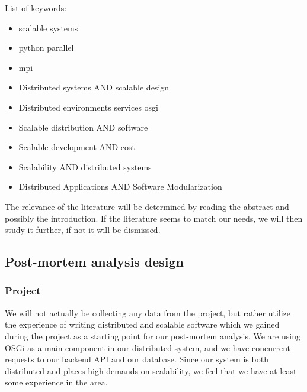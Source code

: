 \documentclass{article}
\begin{document}
List of keywords:
\begin{itemize}
\item{scalable systems}
\item{python parallel}
\item{mpi}
\item{Distributed systems AND scalable design}
\item{Distributed environments services osgi}
\item{Scalable distribution AND software}
\item{Scalable development AND cost}
\item{Scalability AND distributed systems}
\item{Distributed Applications AND Software Modularization}
\end{itemize}

The relevance of the literature will be determined by reading the abstract and
possibly the introduction. If the literature seems to match our needs, we will
then study it further, if not it will be dismissed.

\subsection{Post-mortem analysis design}

\subsubsection{Project}
We will not actually be collecting any data from the project, but rather
utilize the experience of writing distributed and scalable software which we
gained during the project as a starting point for our post-mortem analysis. We
are using OSGi \cite{marples2001open} as a main component in our distributed
system, and we have concurrent requests to our backend API and our database.
Since our system is both distributed and places high demands on scalability, we
feel that we have at least some experience in the area.
\end{document}
